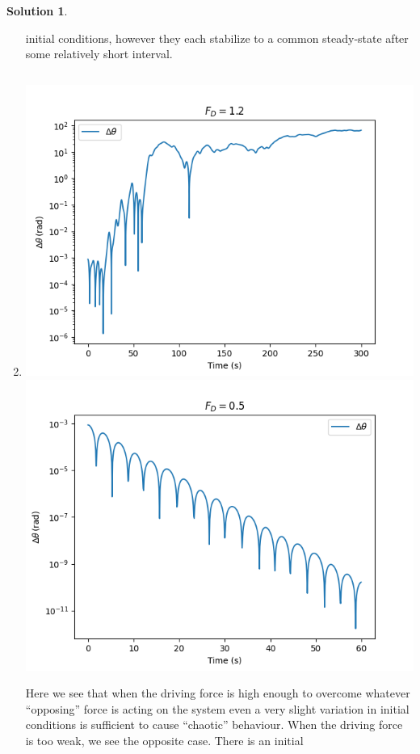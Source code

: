 \documentclass[10pt]{article}
\theoremstyle{definition}
\newtheorem{soln}{Solution}
\begin{document}
\begin{soln}
\begin{enumerate}[label=(\alph*)]
                  initial conditions, however they each stabilize to a common steady-state after some relatively short interval. 
            \item \inputminted[breaklines, autogobble]{python3}{./python/q2/q2b.py}
                  \begin{center}
                        \includegraphics[scale=0.75]{Figure_6-1.png}
                        \includegraphics[scale=0.75]{Figure_6-2.png}
                  \end{center}
                  Here we see that when the driving force is high enough to overcome whatever ``opposing'' force is acting on the system even a very slight variation
                  in initial conditions is sufficient to cause ``chaotic'' behaviour. When the driving force is too weak, we see the opposite case. There is an initial

\end{enumerate}
\end{soln}
\end{document}

